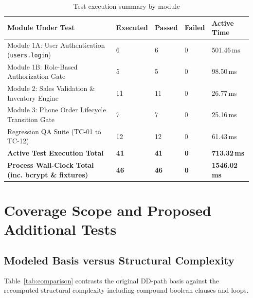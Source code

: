 \documentclass[12pt, a4paper]{report}
\begin{document}
\begin{table}[H]
\centering
\footnotesize
\begin{tabularx}{\textwidth}{L{8.0cm} C{2.0cm} C{2.0cm} C{2.0cm} R{2.0cm}}
\toprule
\textbf{Module Under Test} & \textbf{Executed} & \textbf{Passed} & \textbf{Failed} & \textbf{Active Time} \\
\midrule
Module 1A: User Authentication (\texttt{users.login}) & 6 & 6 & 0 & 501.46\,ms \\
Module 1B: Role-Based Authorization Gate & 5 & 5 & 0 & 98.50\,ms \\
Module 2: Sales Validation \& Inventory Engine & 11 & 11 & 0 & 26.77\,ms \\
Module 3: Phone Order Lifecycle Transition Gate & 7 & 7 & 0 & 25.16\,ms \\
Regression QA Suite (TC-01 to TC-12) & 12 & 12 & 0 & 61.43\,ms \\
\midrule
\textbf{Active Test Execution Total} & \textbf{41} & \textbf{41} & \textbf{0} & \textbf{713.32\,ms} \\
\textbf{Process Wall-Clock Total (inc. bcrypt \& fixtures)} & \textbf{46} & \textbf{46} & \textbf{0} & \textbf{1546.02\,ms} \\
\bottomrule
\end{tabularx}
\caption{Test execution summary by module}
\label{tab:exec_summary}
\end{table}

\chapter{Coverage Scope and Proposed Additional Tests}

\section{Modeled Basis versus Structural Complexity}
Table~\ref{tab:comparison} contrasts the original DD-path basis against the recomputed structural complexity including compound boolean clauses and loops.
\end{document}
